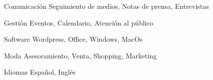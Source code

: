 

\begin{cvskills}

  \cvskill
    {Comunicación} %
    {Seguimiento de medios, Notas de prensa, Entrevistas} %

  \cvskill
    {Gestión} %
    {Eventos, Calendario, Atención al público} %

  \cvskill
    {Software} %
    {Wordpress, Office, Windows, MacOs} %

  \cvskill
    {Moda} %
    {Asesoramiento, Venta, Shopping, Marketing} %

  \cvskill
    {Idiomas} %
    {Español, Inglés} %

\end{cvskills}
